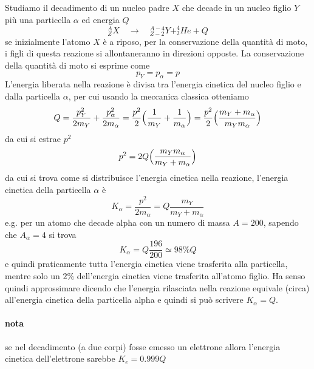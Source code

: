 Studiamo il decadimento di un nucleo padre $X$ che decade in un nucleo figlio $Y$ più una particella $\alpha$ ed energia $Q$
\begin{equation}
^{A}_{Z}X \quad\rightarrow\quad ^{A-4}_{Z-2}Y + ^{4}_{2}He + Q
\end{equation}
se inizialmente l'atomo $X$ è a riposo, per la conservazione della quantità di moto, i figli di questa reazione si allontaneranno in direzioni opposte.
La conservazione della quantità di moto si esprime come 
\begin{equation}
p_Y = p_{\alpha} = p
\end{equation}
L'energia liberata nella reazione è divisa tra l'energia cinetica del nucleo figlio e dalla particella $\alpha$, per cui usando la meccanica classica otteniamo
\begin{equation}
Q = \frac{p_Y^2}{2m_Y} + \frac{p_{\alpha}^2}{2m_{\alpha}} 
= \frac{p^2}{2} \Bigl(  \frac{1}{m_Y}  + \frac{1}{m_{\alpha}}\Bigr)
= \frac{p^2}{2} \Bigl(  \frac{m_Y + m_{\alpha}}{m_Y m_{\alpha}} \Bigr)
\end{equation}
da cui si estrae $p^2$
\begin{equation}
p^2 = 2 Q \Bigl(  \frac{m_Y m_{\alpha}}{m_Y + m_{\alpha}} \Bigr)
\end{equation}
da cui si trova come si distribuisce l'energia cinetica nella reazione, l'energia cinetica della particella $\alpha$ è
\begin{equation}
K_{\alpha} = \frac{p^2}{2m_{\alpha}} = Q \frac{m_Y}{m_Y + m_{\alpha}}
\end{equation}
e.g. per un atomo che decade alpha con un numero di massa $A = 200$, sapendo che $A_{\alpha} = 4$ si trova
\begin{equation}
K_{\alpha} = Q \frac{196}{200} \simeq 98\% Q
\end{equation}
e quindi praticamente tutta l'energia cinetica viene trasferita alla particella, mentre solo un $2\%$ dell'energia cinetica viene trasferita all'atomo figlio.
Ha senso quindi approssimare dicendo che l'energia rilasciata nella reazione equivale (circa) all'energia cinetica della particella alpha e quindi si può scrivere $K_{\alpha} = Q$.

\paragraph{nota} se nel decadimento (a due corpi) fosse emesso un elettrone allora l'energia cinetica dell'elettrone sarebbe $K_e = 0.999 Q$

